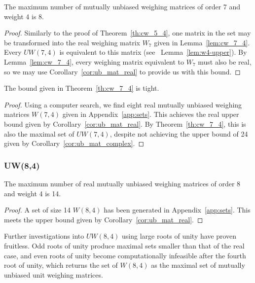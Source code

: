 \begin{theorem} \label{th:cw_7_4}
 The maximum number of mutually unbiased weighing matrices of order 7 and weight 4 is 8.
 \begin{proof}
  Similarly to the proof of Theorem~\ref{th:cw_5_4}, one matrix in the set may be transformed into the real weighing matrix $W_7$ given in Lemma~\ref{lem:cw_7_4}. Every $UW(7,4)$ is equivalent to this matrix (see~ Lemma~\ref{lem:w4-upper}). By Lemma~\ref{lem:cw_7_4}, every weighing matrix equivalent to $W_7$ must also be real, so we may use Corollary~\ref{cor:ub_mat_real} to provide us with this bound.
 \end{proof}
\end{theorem}

\begin{corollary} \label{cor:cw_7_4}
 The bound given in Theorem~\ref{th:cw_7_4} is tight.
 \begin{proof}
  Using a computer search, we find eight real mutually unbiased weighing matrices $W(7,4)$ given in Appendix~\ref{app:sets}. This achieves the real upper bound given by Corollary~\ref{cor:ub_mat_real}. By Theorem~\ref{th:cw_7_4}, this is also the maximal set of $UW(7,4)$, despite not achieving the upper bound of 24 given by Corollary~\ref{cor:ub_mat_complex}.
 \end{proof}

\end{corollary}

\subsubsection{UW(8,4)}
\begin{theorem}\label{th:w_8_4}
 The maximum number of real mutually unbiased weighing matrices of order 8 and weight 4 is 14.
 \begin{proof}
  A set of size 14 $W(8,4)$ has been generated in Appendix~\ref{app:sets}. This meets the upper bound given by Corollary~\ref{cor:ub_mat_real}.
 \end{proof}
\end{theorem}

Further investigations into $UW(8,4)$ using large roots of unity have proven fruitless. Odd roots of unity produce maximal sets smaller than that of the real case, and even roots of unity become computationally infeasible after the fourth root of unity, which returns the set of $W(8,4)$ as the maximal set of mutually unbiased unit weighing matrices.

